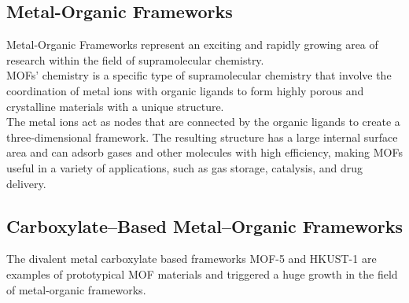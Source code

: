\documentclass[../Master.tex]{subfiles}
\begin{document}
\subsection{Metal-Organic Frameworks}

Metal-Organic Frameworks represent an exciting and rapidly growing area of research within the field of supramolecular chemistry.\\
MOFs' chemistry is a specific type of supramolecular chemistry that involve the coordination of metal ions with organic ligands to form highly porous and crystalline materials with a unique structure. \\
The metal ions act as nodes that are connected by the organic ligands to create a three-dimensional framework. The resulting structure has a large internal surface area and can adsorb gases and other molecules with high efficiency, making MOFs useful in a variety of applications, such as gas storage, catalysis, and drug delivery.

\subsection{Carboxylate–Based Metal–Organic Frameworks}

The divalent metal carboxylate based frameworks MOF-5 and HKUST-1 are examples of prototypical MOF materials and triggered a huge growth in the field of metal-organic frameworks.
\end{document}
